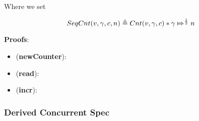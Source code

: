 Where we set

\[
\SCnt{v}{\gamma}{c}{n} \triangleq \Cnt{v}{\gamma}{c} * \apointsto{\gamma}{n}{\frac{1}{2}}
\]

\textbf{Proofs}:
\begin{itemize}
\item (\textbf{newCounter}): 

\item (\textbf{read}):

\item (\textbf{incr}):
\end{itemize}

\subsubsection{Derived Concurrent Spec}